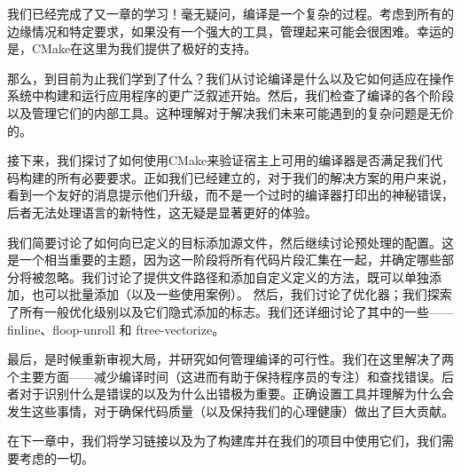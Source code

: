 我们已经完成了又一章的学习！毫无疑问，编译是一个复杂的过程。考虑到所有的边缘情况和特定要求，如果没有一个强大的工具，管理起来可能会很困难。幸运的是，CMake在这里为我们提供了极好的支持。

那么，到目前为止我们学到了什么？我们从讨论编译是什么以及它如何适应在操作系统中构建和运行应用程序的更广泛叙述开始。然后，我们检查了编译的各个阶段以及管理它们的内部工具。这种理解对于解决我们未来可能遇到的复杂问题是无价的。

接下来，我们探讨了如何使用CMake来验证宿主上可用的编译器是否满足我们代码构建的所有必要要求。正如我们已经建立的，对于我们的解决方案的用户来说，看到一个友好的消息提示他们升级，而不是一个过时的编译器打印出的神秘错误，后者无法处理语言的新特性，这无疑是显著更好的体验。

我们简要讨论了如何向已定义的目标添加源文件，然后继续讨论预处理的配置。这是一个相当重要的主题，因为这一阶段将所有代码片段汇集在一起，并确定哪些部分将被忽略。我们讨论了提供文件路径和添加自定义定义的方法，既可以单独添加，也可以批量添加（以及一些使用案例）。 然后，我们讨论了优化器；我们探索了所有一般优化级别以及它们隐式添加的标志。我们还详细讨论了其中的一些——finline、floop-unroll 和 ftree-vectorize。

最后，是时候重新审视大局，并研究如何管理编译的可行性。我们在这里解决了两个主要方面——减少编译时间（这进而有助于保持程序员的专注）和查找错误。后者对于识别什么是错误的以及为什么出错极为重要。正确设置工具并理解为什么会发生这些事情，对于确保代码质量（以及保持我们的心理健康）做出了巨大贡献。

在下一章中，我们将学习链接以及为了构建库并在我们的项目中使用它们，我们需要考虑的一切。